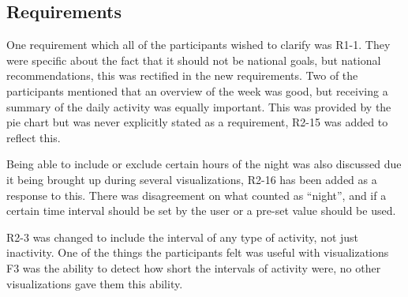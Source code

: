 \subsection{Requirements}
One requirement which all of the participants wished to clarify was R1-1. They were specific about the fact that it should not be national goals, but national recommendations, this was rectified in the new requirements. Two of the participants mentioned that an overview of the week was good, but receiving a summary of the daily activity was equally important. This was provided by the pie chart but was never explicitly stated as a requirement, R2-15 was added to reflect this.

Being able to include or exclude certain hours of the night was also discussed due it being brought up during several visualizations, R2-16 has been added as a response to this. There was disagreement on what counted as ``night'', and if a certain time interval should be set by the user or a pre-set value should be used. 

R2-3 was changed to include the interval of any type of activity, not just inactivity. One of the things the participants felt was useful with visualizations F3 was the ability to detect how short the intervals of activity were, no other visualizations gave them this ability.

